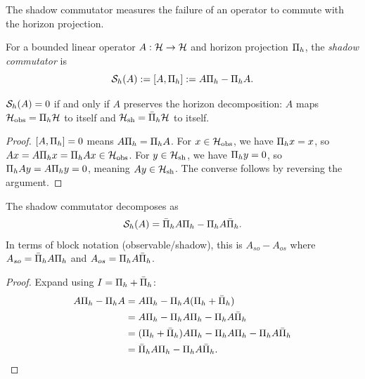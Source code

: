 The shadow commutator measures the failure of an operator to commute with the horizon projection.

\begin{definition}
\label{def:shadow-commutator}
For a bounded linear operator $A: \cH \to \cH$ and horizon projection $\CCPi{h}$, the \emph{shadow commutator} is
\[
\CCShadowComm{A}{h} := [A, \CCPi{h}] := A \CCPi{h} - \CCPi{h} A.
\]
\end{definition}

\begin{lemma}
\label{lem:shadow-vanish}
$\CCShadowComm{A}{h} = 0$ if and only if $A$ preserves the horizon decomposition: $A$ maps $\cH_{\mathrm{obs}} = \CCPi{h} \cH$ to itself and $\cH_{\mathrm{sh}} = \CCPibar{h} \cH$ to itself.
\end{lemma}

\begin{proof}
$[A, \CCPi{h}] = 0$ means $A \CCPi{h} = \CCPi{h} A$.
For $x \in \cH_{\mathrm{obs}}$, we have $\CCPi{h} x = x$, so $A x = A \CCPi{h} x = \CCPi{h} A x \in \cH_{\mathrm{obs}}$.
For $y \in \cH_{\mathrm{sh}}$, we have $\CCPi{h} y = 0$, so $\CCPi{h} A y = A \CCPi{h} y = 0$, meaning $A y \in \cH_{\mathrm{sh}}$.
The converse follows by reversing the argument.
\end{proof}

\begin{lemma}
\label{lem:shadow-decomposition}
The shadow commutator decomposes as
\[
\CCShadowComm{A}{h} = \CCPibar{h} A \CCPi{h} - \CCPi{h} A \CCPibar{h}.
\]
In terms of block notation (observable/shadow), this is $A_{so} - A_{os}$ where $A_{so} = \CCPibar{h} A \CCPi{h}$ and $A_{os} = \CCPi{h} A \CCPibar{h}$.
\end{lemma}

\begin{proof}
Expand using $I = \CCPi{h} + \CCPibar{h}$:
\begin{align*}
A \CCPi{h} - \CCPi{h} A &= A \CCPi{h} - \CCPi{h} A (\CCPi{h} + \CCPibar{h}) \\
&= A \CCPi{h} - \CCPi{h} A \CCPi{h} - \CCPi{h} A \CCPibar{h} \\
&= (\CCPi{h} + \CCPibar{h}) A \CCPi{h} - \CCPi{h} A \CCPi{h} - \CCPi{h} A \CCPibar{h} \\
&= \CCPibar{h} A \CCPi{h} - \CCPi{h} A \CCPibar{h}. \qedhere
\end{align*}
\end{proof}

